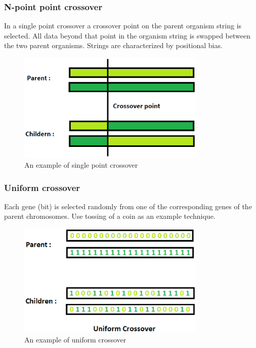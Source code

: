 \subsubsection{N-point point crossover}
In a single point crossover a crossover point on the parent organism string is selected. 
All data beyond that point in the organism string is swapped between the two parent organisms. 
Strings are characterized by positional bias.
\begin{figure}[htb] 
	\label{fig:single_crossover}
	\centering
	\includegraphics[width=0.8\textwidth]{figures/single_crossover}
	\caption{An example of single point crossover}
\end{figure}

\subsubsection{Uniform crossover}
Each gene (bit) is selected randomly from one of the corresponding genes of the parent chromosomes.
Use tossing of a coin as an example technique.
\begin{figure}[htb] 
	\label{fig:uniform_crossover}
	\centering
	\includegraphics[width=0.8\textwidth]{figures/uniform_crossover}
	\caption{An example of uniform crossover}
\end{figure}


